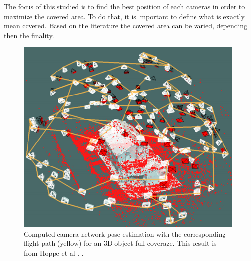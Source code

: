 The focus of this studied is to find the best position of each cameras in order to maximize the covered area. To do that, it is important to define what is exactly mean covered. Based on the literature the covered area can be varied, depending then the finality. 
\begin{figure}[t!]
   \includegraphics[width=\linewidth]{img/objectCoverFrom142.png}
  \caption{ Computed camera network pose estimation with the corresponding flight path (yellow) for an 3D object full coverage. This result is from Hoppe et al \cite{142*hoppe2012}. 
.}\label{fig:ObjectCover142}
  \endminipage\hfill
\end{figure}

